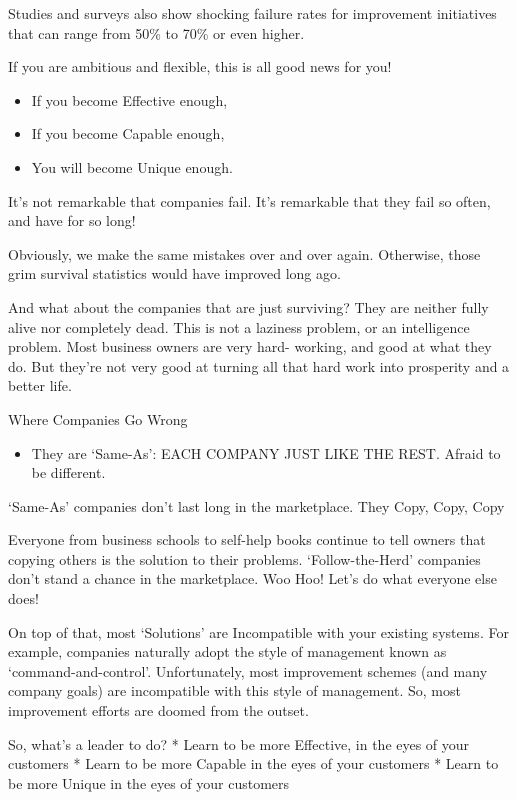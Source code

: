 \documentclass[
]{book}
\providecommand{\tightlist}{%
  \setlength{\itemsep}{0pt}\setlength{\parskip}{0pt}}
\begin{document}
Studies and surveys also show shocking failure rates for improvement initiatives that can range from 50\% to 70\% or even higher.

If you are ambitious and flexible, this is all good news for you!

\begin{itemize}
\tightlist
\item
  If you become Effective enough,
\item
  If you become Capable enough,
\item
  You will become Unique enough.
\end{itemize}

It's not remarkable that companies fail. It's remarkable that they fail so often, and have for so long!

Obviously, we make the same mistakes over and over again. Otherwise, those grim survival statistics would have improved long ago.

And what about the companies that are just surviving? They are neither fully alive nor completely dead. This is not a laziness problem, or an intelligence problem. Most business owners are very hard- working, and good at what they do. But they're not very good at turning all that hard work into prosperity and a better life.

Where Companies Go Wrong

\begin{itemize}
\tightlist
\item
  They are `Same-As': EACH COMPANY JUST LIKE THE REST. Afraid to be different.
\end{itemize}

`Same-As' companies don't last long in the marketplace. They Copy, Copy, Copy

Everyone from business schools to self-help books continue to tell owners that copying others is the solution to their problems. `Follow-the-Herd' companies don't stand a chance in the marketplace. Woo Hoo! Let's do what everyone else does!

On top of that, most `Solutions' are Incompatible with your existing systems. For example, companies naturally adopt the style of management known as `command-and-control'. Unfortunately, most improvement schemes (and many company goals) are incompatible with this style of management. So, most improvement efforts are doomed from the outset.

So, what's a leader to do?
* Learn to be more Effective, in the eyes of your customers
* Learn to be more Capable in the eyes of your customers
* Learn to be more Unique in the eyes of your customers
\end{document}

